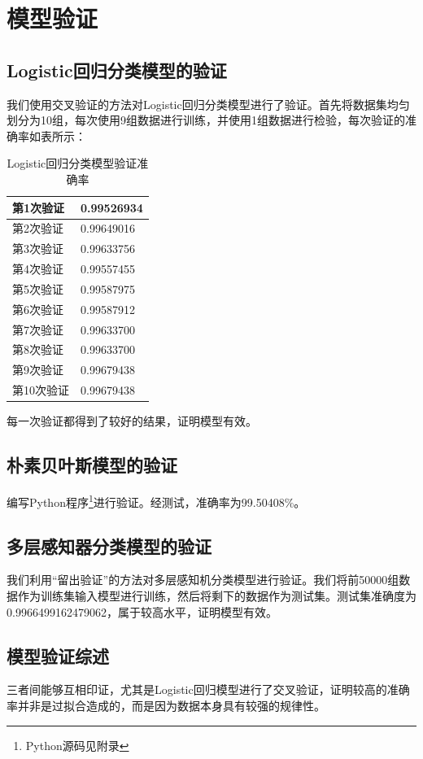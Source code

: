 \documentclass[UTF8,12pt,songti]{ctexart}
\begin{document}
\section{模型验证}
\subsection{Logistic回归分类模型的验证}
我们使用交叉验证的方法对Logistic回归分类模型进行了验证。首先将数据集均匀划分为10组，每次使用9组数据进行训练，并使用1组数据进行检验，每次验证的准确率如表所示：
\begin{table}[H]
\centering
\begin{tabular}{|p{6cm} |p{6cm} | }%
\hline  %
第1次验证&0.99526934 \\
\hline
第2次验证&0.99649016 \\
\hline
第3次验证&0.99633756 \\
\hline
第4次验证&0.99557455\\
\hline
第5次验证&0.99587975\\
\hline
第6次验证&0.99587912\\
\hline
第7次验证&0.99633700\\
\hline
第8次验证&0.99633700\\
\hline
第9次验证&0.99679438\\
\hline
第10次验证&0.99679438\\
\hline %
\end{tabular}
\caption{Logistic回归分类模型验证准确率}
\end{table}
\par 每一次验证都得到了较好的结果，证明模型有效。
\subsection{朴素贝叶斯模型的验证}
编写Python程序\footnote{Python源码见附录}进行验证。经测试，准确率为99.50408\%。
\subsection{多层感知器分类模型的验证}
我们利用“留出验证”的方法对多层感知机分类模型进行验证。我们将前50000组数据作为训练集输入模型进行训练，然后将剩下的数据作为测试集。测试集准确度为0.9966499162479062，属于较高水平，证明模型有效。
\subsection{模型验证综述}
三者间能够互相印证，尤其是Logistic回归模型进行了交叉验证，证明较高的准确率并非是过拟合造成的，而是因为数据本身具有较强的规律性。
\end{document}
